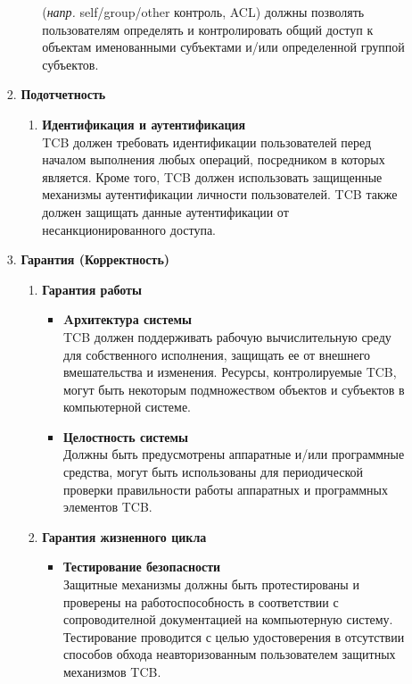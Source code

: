 \begin{enumerate}
\begin{enumerate}
\begin{enumerate}
\begin{enumerate}
				(\textit{напр.} self/group/other контроль, ACL) должны позволять пользователям определять и контролировать общий доступ к объектам именованными субъектами и/или определенной группой
				субъектов.
			\end{enumerate}
			\item{\textbf{Подотчетность}}
			\begin{enumerate}
				\item{\textbf{Идентификация и аутентификация}}\\
				TCB должен требовать идентификации пользователей перед началом выполнения любых операций, посредником в которых является. Кроме того, TCB должен использовать защищенные механизмы
				аутентификации личности пользователей. TCB также должен защищать данные аутентификации от несанкционированного доступа.
			\end{enumerate}
			\item{\textbf{Гарантия (Корректность)}}
			\begin{enumerate}
				\item{\textbf{Гарантия работы}}
				\begin{itemize}
					\item{\textbf{Aрхитектура системы}}\\
					TCB должен поддерживать рабочую вычислительную среду для собственного исполнения, защищать ее от внешнего вмешательства и изменения. Ресурсы, контролируемые TCB, могут быть
					некоторым подмножеством объектов и субъектов в компьютерной системе.
					\item{\textbf{Целостность системы}}\\
					Должны быть предусмотрены аппаратные и/или программные средства, могут быть использованы для периодической проверки правильности работы аппаратных и программных элементов TCB.
				\end{itemize}
				\item{\textbf{Гарантия жизненного цикла}}
				\begin{itemize}
					\item{\textbf{Тестирование безопасности}}\\
					Защитные механизмы должны быть протестированы и проверены на работоспособность в соответствии с сопроводителной документацией на компьютерную систему.
					Тестирование проводится с целью удостоверения в отсутствии способов обхода неавторизованным пользователем защитных механизмов TCB.  
				\end{itemize}
			\end{enumerate}
		\end{enumerate}

\end{enumerate}
\end{enumerate}
